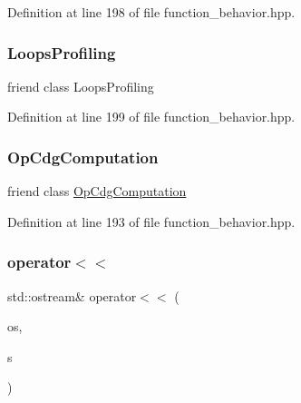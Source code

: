 Definition at line 198 of file function\+\_\+behavior.\+hpp.

\mbox{\label{classFunctionBehavior_aa0b8ea11ea1cf633a99d0bc8c7e03cbf}} 
\subsubsection{\texorpdfstring{Loops\+Profiling}{LoopsProfiling}}
{\footnotesize\ttfamily friend class Loops\+Profiling\hspace{0.3cm}{\ttfamily [friend]}}



Definition at line 199 of file function\+\_\+behavior.\+hpp.

\mbox{\label{classFunctionBehavior_a2c6c15184a2b102e18966b26919d9196}} 
\subsubsection{\texorpdfstring{Op\+Cdg\+Computation}{OpCdgComputation}}
{\footnotesize\ttfamily friend class \hyperlink{classOpCdgComputation}{Op\+Cdg\+Computation}\hspace{0.3cm}{\ttfamily [friend]}}



Definition at line 193 of file function\+\_\+behavior.\+hpp.

\mbox{\label{classFunctionBehavior_ad0fee259c205f4cf083eb62aefb6a653}} 
\subsubsection{\texorpdfstring{operator$<$$<$}{operator<<}\hspace{0.1cm}{\footnotesize\ttfamily [1/2]}}
{\footnotesize\ttfamily std\+::ostream\& operator$<$$<$ (\begin{DoxyParamCaption}\item[{std\+::ostream \&}]{os,  }\item[{const \hyperlink{classFunctionBehavior}{Function\+Behavior} \&}]{s }\end{DoxyParamCaption})\hspace{0.3cm}{\ttfamily [friend]}}



